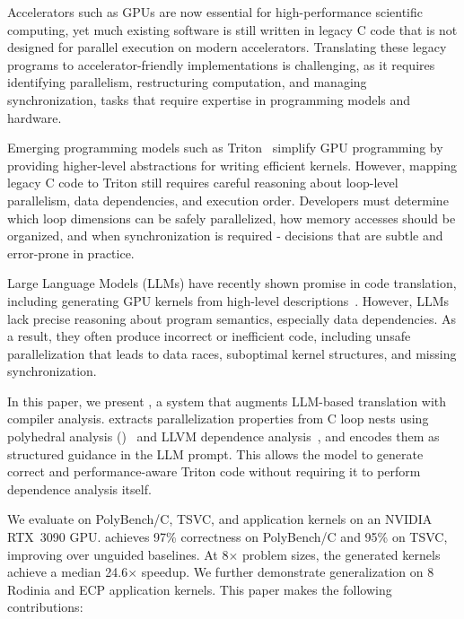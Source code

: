 \documentclass[sigconf]{acmart}
\begin{document}
Accelerators such as GPUs are now essential for high-performance scientific computing, yet much existing software is still written in legacy C code that is not designed for parallel execution on modern accelerators. Translating these legacy programs to accelerator-friendly implementations is challenging, as it requires identifying parallelism, restructuring computation, and managing synchronization, tasks that require expertise in programming models and hardware.


Emerging programming models such as Triton~\cite{tillet2019triton} simplify GPU programming by providing higher-level abstractions for writing efficient kernels. However, mapping legacy C code to Triton still requires careful reasoning about loop-level parallelism, data dependencies, and execution order. Developers must determine which loop dimensions can be safely parallelized, how memory accesses should be organized, and when synchronization is required - decisions that are subtle and error-prone in practice.


Large Language Models (LLMs) have recently shown promise in code translation, including generating GPU kernels from high-level descriptions~\cite{chen2024chatgpt, ouyang2024kernelbench}. However, LLMs lack precise reasoning about program semantics, especially data dependencies. As a result, they often produce incorrect or inefficient code, including unsafe parallelization that leads to data races, suboptimal kernel structures, and missing synchronization.


In this paper, we present \sysname, a system that augments LLM-based translation with compiler analysis. \sysname extracts parallelization properties from C loop nests using polyhedral analysis (\pet)~\cite{verdoolaege2012polyhedral} and LLVM dependence analysis~\cite{llvm}, and encodes them as structured guidance in the LLM prompt. This allows the model to generate correct and performance-aware Triton code without requiring it to perform dependence analysis itself. 

We evaluate \sysname on PolyBench/C, TSVC, and application kernels on an NVIDIA RTX~3090 GPU. \sysname achieves 97\% correctness on PolyBench/C and 95\% on TSVC, improving over unguided baselines. At 8$\times$ problem sizes, the generated kernels achieve a median 24.6$\times$ speedup. We further demonstrate generalization on 8 Rodinia and ECP application kernels. This paper makes the following contributions:
\end{document}
